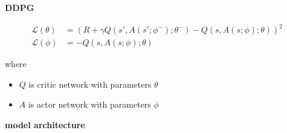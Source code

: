 \documentclass[xcolor=dvipsnames]{beamer}
\begin{document}
\begin{frame}{\bf DDPG}


  \begin{align*}
    \mathcal{L(\theta)} &= \left( R + \gamma Q(s', A(s'; \phi^-); \theta^-) - Q(s, A(s; \phi); \theta)  \right)^2 \\
    \mathcal{L(\phi)} &= -Q(s, A(s; \phi); \theta)
  \end{align*}

  where
  \begin{itemize}
    \item $Q$ is critic network with parameters $\theta$
    \item $A$ is actor network with parameters $\phi$
  \end{itemize}
  
\end{frame}


\begin{frame}{\bf model architecture}


\end{frame}
\end{document}
